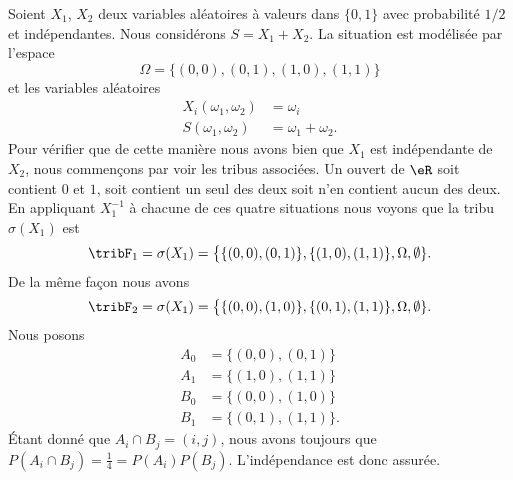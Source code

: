 \begin{example}
    Soient \( X_1\), \( X_2\) deux variables aléatoires à valeurs dans \( \{ 0,1 \}\) avec probabilité \( 1/2\) et indépendantes. Nous considérons \( S=X_1+X_2\). La situation est modélisée par l'espace
    \begin{equation}
        \Omega=\{ (0,0),(0,1),(1,0),(1,1) \}
    \end{equation}
    et les variables aléatoires
    \begin{subequations}
        \begin{align}
            X_i(\omega_1,\omega_2)&=\omega_{i}\\
            S(\omega_1,\omega_2)&=\omega_1+\omega_2.
        \end{align}
    \end{subequations}
    Pour vérifier que de cette manière nous avons bien que \( X_1\) est indépendante de \( X_2\), nous commençons par voir les tribus associées. Un ouvert de \( \eR\) soit contient \( 0\) et \( 1\), soit contient un seul des deux soit n'en contient aucun des deux. En appliquant \( X_1^{-1}\) à chacune de ces quatre situations nous voyons que la tribu \( \sigma(X_1)\) est
    \begin{equation}
        \tribF_1=\sigma(X_1)=\big\{ \{ (0,0),(0,1) \},\{ (1,0),(1,1) \},\Omega,\emptyset \}.
    \end{equation}
    De la même façon nous avons
    \begin{equation}
        \tribF_2=\sigma(X_1)=\big\{ \{ (0,0),(1,0) \},\{ (0,1),(1,1) \},\Omega,\emptyset \}.
    \end{equation}
    Nous posons
    \begin{subequations}
        \begin{align}
            A_0&=\{ (0,0),(0,1) \}\\
            A_1&=\{ (1,0),(1,1) \}\\
            B_0&=\{ (0,0),(1,0) \}\\
            B_1&=\{ (0,1),(1,1) \}.
        \end{align}
    \end{subequations}
    Étant donné que \( A_i\cap B_j=(i,j)\), nous avons toujours que \( P(A_i\cap B_j)=\frac{1}{ 4 }=P(A_i)P(B_j)\). L'indépendance est donc assurée.


\end{example}
